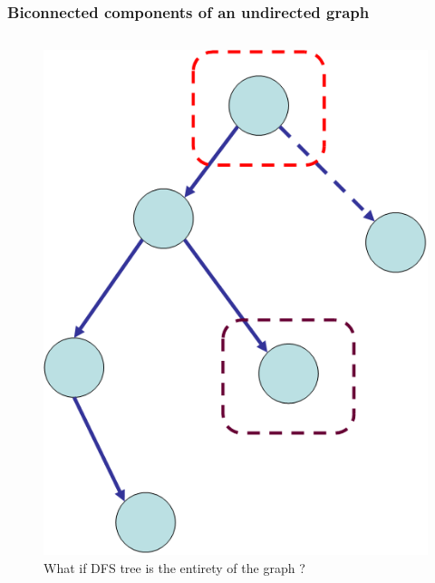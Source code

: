 \begin{frame}
  \frametitle{Biconnected components of an undirected graph}

    \begin{columns}
      \begin{column}{0.50\textwidth}
         \begin{figure}
            \begin{center}
              \includegraphics[scale=0.30]{figure/bfs_dfs/dfsbiconn}
              \caption{What if DFS tree is the entirety of the graph ?}
              \label{fig:dfsbiconn}
            \end{center}
          \end{figure}
      \end{column}


\end{columns}
\end{frame}

